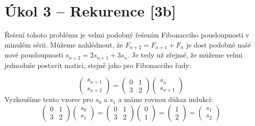 \documentclass{../../../ksp}
\begin{document}
\section*{Úkol 3 – Rekurence [3b]}

Řešení tohoto problému je velmi podobný řešením Fibonacciho pousloupnosti v minulém sérii.
Můžeme nahlédnout, že $F_{n+2} = F_{n+1} + F_n$ je dost podobné našé nové pousloupnosti
$s_{n+2} = 2s_{n+1} + 3s_n$. Je tedy už zřejmé, že můžeme velmi jednoduše postavit matici, stejně jako pro Fibonacciho řady:

\begin{equation}
    \begin{pmatrix}
        s_{n+1}\\
        s_{n+2}
    \end{pmatrix}
    =
    \begin{pmatrix}
        0 & 1\\
        3 & 2
    \end{pmatrix}
    \begin{pmatrix}
        s_{n}\\
        s_{n+1}
    \end{pmatrix}
\end{equation}
Vyzkoušíme tento vzorec pro $s_0$ a $s_1$ a máme rovnou důkaz indukcí:
\begin{equation}
    \begin{pmatrix}
        0 & 1\\
        3 & 2
    \end{pmatrix}
    \begin{pmatrix}
        s_{0}\\
        s_{1}
    \end{pmatrix}
    =
    \begin{pmatrix}
        0 & 1\\
        3 & 2
    \end{pmatrix}
    \begin{pmatrix}
        0\\
        1
    \end{pmatrix}
    =
    \begin{pmatrix}
        1\\
        2
    \end{pmatrix}
    =
    \begin{pmatrix}
        s_{1}\\
        s_{2}
    \end{pmatrix}
\end{equation}
\end{document}
